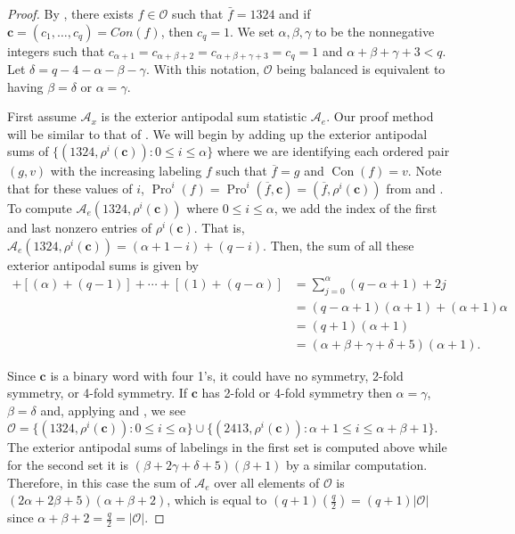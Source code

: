 \documentclass[11pt]{amsart}
\theoremstyle{definition}
\newcommand{\as}{\mathcal{A}}
\newcommand{\ase}{\mathcal{A}_e}
\DeclareMathOperator{\Pro}{\mathrm{Pro}}
\DeclareMathOperator{\Con}{\mathrm{Con}}
\begin{document}
\begin{proof}
By , there exists $f\in\mathcal{O}$ such that $\bar{f} = 1324$ and if $\mathbf{c} = (c_1,\ldots,c_q) = Con(f)$, then $c_q = 1$. We set $\alpha, \beta,\gamma$ to be the nonnegative integers such that $c_{\alpha + 1}=c_{\alpha + \beta + 2} = c_{\alpha+\beta+\gamma+3}=c_q=1$ and $\alpha+\beta+\gamma+3<q$. Let $\delta = q - 4 - \alpha - \beta-\gamma$. 
With this notation, $\mathcal{O}$ being balanced is equivalent to having $\beta = \delta$ or $\alpha = \gamma$.

First assume $\as_x$ is the exterior antipodal sum statistic $\ase$. Our proof method will be similar to that of . We will begin by adding up the  exterior antipodal sums of $\{(1324, \rho^i(\mathbf{c})): 0 \leq i \leq \alpha\}$ where we are identifying each ordered pair $(g,v)$ with the increasing labeling $f$ such that $\overline{f}=g$ and $\Con(f)=v$. Note that for these values of $i$, $\Pro^i(f)= \Pro^i(\overline{f}, \mathbf{c}) = (\overline{f}, \rho^i(\mathbf{c}))$ from  and . To compute $\ase(1324, \rho^i(\mathbf{c}))$ where $0 \leq i \leq \alpha$, we add the index of the first and last nonzero entries of $\rho^i(\mathbf{c})$.  That is, $\ase(1324, \rho^i(\mathbf{c}))=(\alpha+1-i)+(q-i)$. Then, the sum of all these exterior antipodal sums is given by \begin{align*}[(\alpha + 1)+(q)] + [(\alpha)+ (q-1)] + \cdots + [(1)+(q-\alpha)] &= \sum_{j=0}^\alpha (q-\alpha+1) + 2j\\ &= (q-\alpha+1)(\alpha+1) + (\alpha+1)\alpha\\ &=(q+1)(\alpha+1)\\
&= (\alpha + \beta + \gamma + \delta + 5)(\alpha + 1).\end{align*}

Since $\mathbf{c}$ is a binary word with four 1's,  it could have no symmetry, 2-fold symmetry, or 4-fold symmetry.  If $\mathbf{c}$ has 2-fold or 4-fold symmetry then $\alpha=\gamma$, $\beta=\delta$ and, applying  and , we see $\mathcal{O} = \{(1324,\rho^i(\mathbf{c})): 0 \leq i \leq \alpha\} \cup \{(2413, \rho^i(\mathbf{c})):\alpha+1 \leq i \leq \alpha + \beta + 1\}$.
The exterior antipodal sums of labelings in the first set is computed above while for the second set it is $(\beta + 2\gamma + \delta + 5)(\beta+1)$ by a similar computation. 
Therefore, in this case the sum of $\as_e$ over all elements of $\mathcal{O}$ is $(2\alpha + 2\beta + 5)(\alpha + \beta + 2)$, which is equal to $(q+1)(\frac{q}{2}) = (q+1) \vert \mathcal{O} \vert$ since $\alpha + \beta + 2 = \frac{q}{2}=|\mathcal{O}|$.


\end{proof}
\end{document}
